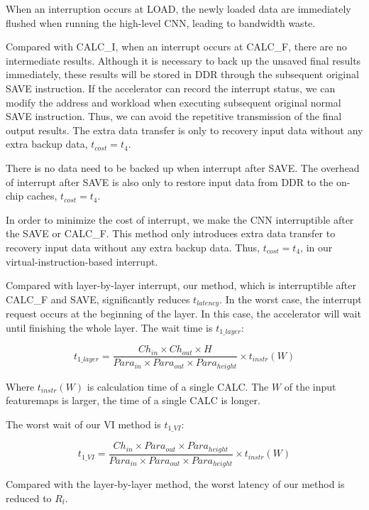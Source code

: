 When an interruption occurs at LOAD, the newly loaded data are immediately flushed when running the high-level CNN, leading to bandwidth waste.

Compared with CALC\_I, when an interrupt occurs at CALC\_F, there are no intermediate results. 
Although it is necessary to back up the unsaved final results immediately, these results will be stored in DDR through the subsequent original SAVE instruction.
If the accelerator can record the interrupt status, we can modify the address and workload when executing subsequent original normal SAVE instruction.
Thus, we can avoid the repetitive transmission of the final output results. The extra data transfer is only to recovery input data without any extra backup data, $t_{cost} = t_4$.

There is no data need to be backed up when interrupt after SAVE. The overhead of interrupt after SAVE is also only to restore input data from DDR to the on-chip caches, $t_{cost} = t_4$.

In order to minimize the cost of interrupt, we make the CNN interruptible after the SAVE or CALC\_F. This method only introduces extra data transfer to recovery input data without any extra backup data. Thus, $t_{cost} = t_4$, in our virtual-instruction-based interrupt.

Compared with layer-by-layer interrupt, our method, which is interruptible after CALC\_F and SAVE, significantly reduces $t_{latency}$.
In the worst case, the interrupt request occurs at the beginning of the layer. In this case, the accelerator will wait until finishing the whole layer. The wait time is $t_{1\_layer}$:

\begin{equation*}
	t_{1\_layer} = \frac{ Ch_{in} \times Ch_{out} \times H }{ Para_{in} \times Para_{out} \times Para_{height} } \times t_{instr}(W)
\end{equation*}

Where $t_{instr}(W)$ is calculation time of a single CALC. The $W$ of the input featuremaps is larger, the time of a single CALC is longer.

The worst wait of our VI method is $t_{1\_VI}$:

\begin{equation*}
	t_{1\_VI} = \frac{ Ch_{in} \times Para_{out} \times Para_{height} }{ Para_{in} \times Para_{out} \times Para_{height} } \times t_{instr}(W)
\end{equation*}

Compared with the layer-by-layer method, the worst latency of our method is reduced to $R_l$.

